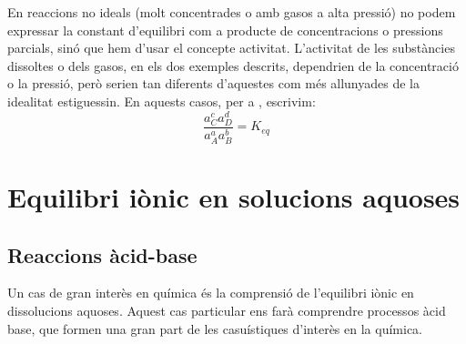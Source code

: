En reaccions no ideals (molt concentrades o amb gasos a alta pressió) no podem expressar la constant d'equilibri com a producte de concentracions o pressions parcials, sinó que hem d'usar el concepte activitat. L'activitat de les substàncies dissoltes o dels gasos, en els dos exemples descrits, dependrien de la concentració o la pressió, però serien tan diferents d'aquestes com més allunyades de la idealitat estiguessin. En aquests casos, per a , escrivim:
\[
\frac{a_C^c a_D^d}{a_A^a a_B^b}=K_{eq}
\]

%
%
\section{Equilibri iònic en solucions aquoses}

\subsection{Reaccions àcid-base}

Un cas de gran interès en química és la comprensió de l'equilibri iònic en dissolucions aquoses. 
Aquest cas particular ens farà comprendre processos àcid base, que formen una gran part de les casuístiques d'interès en la química.

